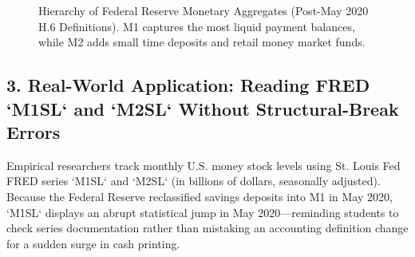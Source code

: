 \documentclass[11pt,letterpaper]{article}
\begin{document}
\begin{figure}[htbp]
\centering
{}
\caption{Hierarchy of Federal Reserve Monetary Aggregates (Post-May 2020 H.6 Definitions). M1 captures the most liquid payment balances, while M2 adds small time deposits and retail money market funds.}
\label{fig:monetary_aggregates_hierarchy}
\end{figure}

\subsection*{3. Real-World Application: Reading FRED `M1SL` and `M2SL` Without Structural-Break Errors}
Empirical researchers track monthly U.S. money stock levels using St. Louis Fed FRED series `M1SL` and `M2SL` (in billions of dollars, seasonally adjusted). Because the Federal Reserve reclassified savings deposits into M1 in May 2020, `M1SL` displays an abrupt statistical jump in May 2020—reminding students to check series documentation rather than mistaking an accounting definition change for a sudden surge in cash printing.
\end{document}
